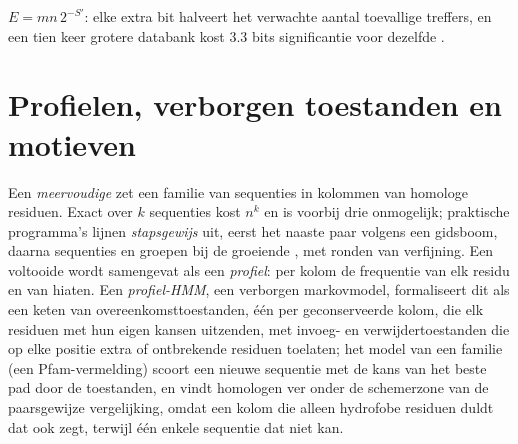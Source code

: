 \begin{omfigure}

{\small $E = mn\,2^{-S'}$: elke extra bit halveert het verwachte aantal
toevallige treffers, en een tien keer grotere databank kost $3.3$ bits
significantie voor dezelfde .}
\end{omfigure}

\section{Profielen, verborgen toestanden en motieven}

\begin{definition}\label{def:b3:bioinformatics:msa}
Een \emph{meervoudige } zet een familie van
sequenties in kolommen van homologe residuen. Exact  over $k$ sequenties kost $n^{k}$ en is voorbij drie
onmogelijk; praktische programma's lijnen \emph{stapsgewijs} uit,
eerst het naaste paar volgens een gidsboom, daarna sequenties en
groepen bij de groeiende , met ronden van verfijning. Een
voltooide  wordt samengevat als een \emph{profiel}: per
kolom de frequentie van elk residu en van hiaten. Een
\emph{profiel-HMM}, een verborgen markovmodel, formaliseert dit als een
keten van overeenkomsttoestanden, één per geconserveerde kolom, die elk
residuen met hun eigen kansen uitzenden, met invoeg- en
verwijdertoestanden die op elke positie extra of ontbrekende residuen
toelaten; het model van een familie (een Pfam-vermelding) scoort een
nieuwe sequentie met de kans van het beste pad door de toestanden, en
vindt homologen ver onder de schemerzone van de paarsgewijze
vergelijking, omdat een kolom die alleen hydrofobe residuen duldt dat
ook zegt, terwijl één enkele sequentie dat niet kan.
\end{definition}

